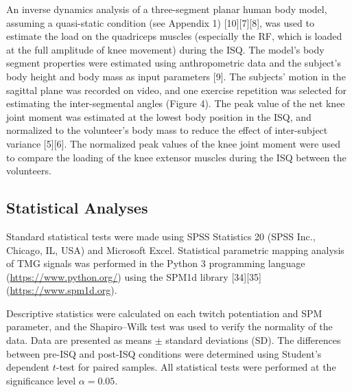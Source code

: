 \documentclass[utf8]{style/FrontiersinHarvard}
\begin{document}
An inverse dynamics analysis of a three-segment planar human body model, assuming a quasi-static condition (see Appendix 1) [10][7][8], was used to estimate the load on the quadriceps muscles (especially the RF, which is loaded at the full amplitude of knee movement) during the ISQ.
The model's body segment properties were estimated using anthropometric data and the subject’s body height and body mass as input parameters [9].
The subjects' motion in the sagittal plane was recorded on video, and one exercise repetition was selected for estimating the inter-segmental angles (Figure 4).
The peak value of the net knee joint moment was estimated at the lowest body position in the ISQ,
and normalized to the volunteer’s body mass to reduce the effect of inter-subject variance [5][6].
The normalized peak values of the knee joint moment were used to compare the loading of the knee extensor muscles during the ISQ between the volunteers.

\subsection{Statistical Analyses}
Standard statistical tests were made using SPSS Statistics 20 (SPSS Inc., Chicago, IL, USA) and Microsoft Excel.
Statistical parametric mapping analysis of TMG signals was performed in the Python 3 programming language (\url{https://www.python.org/})
using the SPM1d library [34][35] (\url{https://www.spm1d.org}).


Descriptive statistics were calculated on each twitch potentiation and SPM parameter, and the Shapiro–Wilk test was used to verify the normality of the data.
Data are presented as means $ \pm $ standard deviations (SD).
The differences between pre-ISQ and post-ISQ conditions were determined using Student’s dependent $ t $-test for paired samples.
All statistical tests were performed at the significance level $ \alpha = 0.05 $.
\end{document}
